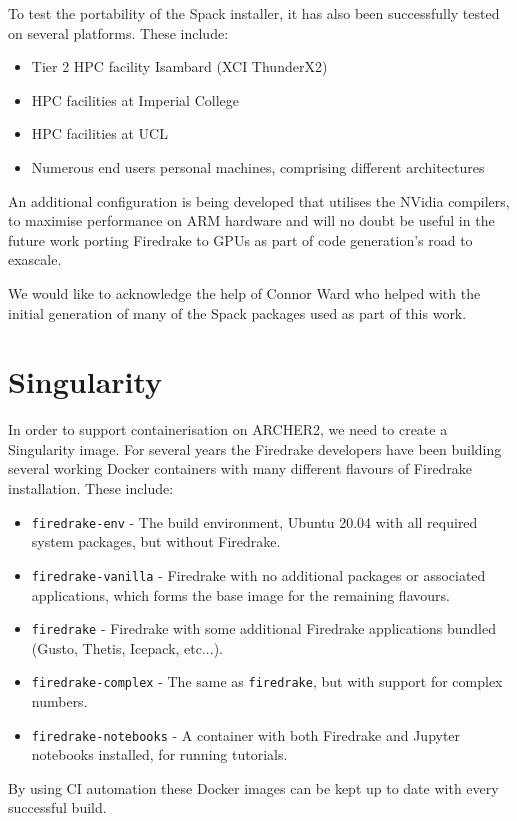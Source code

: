 \documentclass[a4paper,11pt]{article}
\begin{document}
To test the portability of the Spack installer, it has also been successfully tested on several platforms.
These include:
\begin{itemize}[topsep=2pt, partopsep=0pt, itemsep=1pt, parsep=1pt]
	\item Tier 2 HPC facility Isambard (XCI ThunderX2)
	\item HPC facilities at Imperial College
	\item HPC facilities at UCL
	\item Numerous end users personal machines, comprising different architectures
\end{itemize} 
An additional configuration is being developed that utilises the NVidia compilers, to maximise performance on ARM hardware and will no doubt be useful in the future work porting Firedrake to GPUs as part of code generation's road to exascale.

We would like to acknowledge the help of Connor Ward who helped with the initial generation of many of the Spack packages used as part of this work.


\section{Singularity}
\label{sec:singularity}
In order to support containerisation on ARCHER2, we need to create a Singularity image.
For several years the Firedrake developers have been building several working Docker containers with many different flavours of Firedrake installation.
These include:
\begin{itemize}[topsep=2pt, partopsep=0pt, itemsep=1pt, parsep=1pt]
	\item \verb`firedrake-env` - The build environment, Ubuntu 20.04 with all required system packages, but without Firedrake.
	\item \verb`firedrake-vanilla` - Firedrake with no additional packages or associated applications, which forms the base image for the remaining flavours.
	\item \verb`firedrake` - Firedrake with some additional Firedrake applications bundled (Gusto, Thetis, Icepack, etc...).
	\item \verb`firedrake-complex` - The same as \verb`firedrake`, but with support for complex numbers.
	\item \verb`firedrake-notebooks` - A container with both Firedrake and Jupyter notebooks installed, for running tutorials.
\end{itemize}    
By using CI automation these Docker images can be kept up to date with every successful build.
\end{document}
